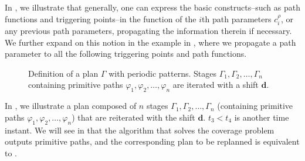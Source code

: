 In , we illustrate that generally, one can express the basic constructs--such as path functions and triggering points--in the function of the $i$th path parameters $c_{i}^{\rho}$, or any previous path parameters, propagating the information therein if necessary. We further expand on this notion in the example in , where we propagate a path parameter to all the following triggering points and path functions.

\begin{figure}[h!]
  \center
  \caption[Definition of a plan with a loop]{Definition of a plan $\Gamma$ with periodic patterns. Stages $\Gamma_1,\Gamma_2,\dots,\Gamma_n$ containing primitive paths $\varphi_1,\varphi_2,\dots,\varphi_n$ are iterated with a shift $\mathbf{d}$.}
  \label{fig:state-machine-loop}
\end{figure}
In , we illustrate a plan composed of $n$ stages $\Gamma_1,\Gamma_2,\dots,\Gamma_n$ (containing primitive paths $\varphi_1,\varphi_2,\dots,\varphi_n$) that are reiterated with the shift $\mathbf{d}$. $t_3<t_4$ is another time instant. We will see in  that the algorithm that solves the coverage problem outputs primitive paths, and the corresponding plan to be replanned is equivalent to . 

